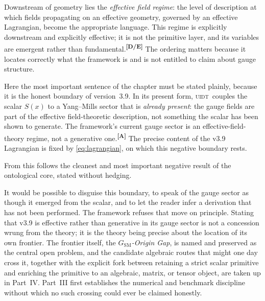 \documentclass[12pt,a4paper,twoside]{article}
\theoremstyle{plain}
\theoremstyle{definition}
\theoremstyle{remark}
\newcommand{\UIDT}{\textsc{uidt}}
\newcommand{\catmark}[1]{\textsuperscript{\textsf{\textbf{[#1]}}}}
\begin{document}
Downstream of geometry lies the \emph{effective field regime}: the level of description at which fields propagating on an effective geometry, governed by an effective Lagrangian, become the appropriate language. This regime is explicitly downstream and explicitly effective; it is not the primitive layer, and its variables are emergent rather than fundamental.\catmark{D/E} The ordering matters because it locates correctly what the framework is and is not entitled to claim about gauge structure.

Here the most important sentence of the chapter must be stated plainly, because it is the honest boundary of version~3.9. In its present form, \UIDT\ couples the scalar $S(x)$ to a Yang--Mills sector that is \emph{already present}: the gauge fields are part of the effective field-theoretic description, not something the scalar has been shown to generate. The framework's current gauge sector is an effective-field-theory regime, not a generative one.\catmark{A} The precise content of the v3.9 Lagrangian is fixed by \cref{eq:lagrangian}, on which this negative boundary rests.

From this follows the cleanest and most important negative result of the ontological core, stated without hedging.



\noindent It would be possible to disguise this boundary, to speak of the gauge sector as though it emerged from the scalar, and to let the reader infer a derivation that has not been performed. The framework refuses that move on principle. Stating that v3.9 is effective rather than generative in its gauge sector is not a concession wrung from the theory; it is the theory being precise about the location of its own frontier. The frontier itself, the \emph{$G_{\mathrm{SM}}$-Origin Gap}, is named and preserved as the central open problem, and the candidate algebraic routes that might one day cross it, together with the explicit fork between retaining a strict scalar primitive and enriching the primitive to an algebraic, matrix, or tensor object, are taken up in Part~IV. 
Part~III first establishes the numerical and benchmark discipline without which no such crossing could ever be claimed honestly.
\end{document}
